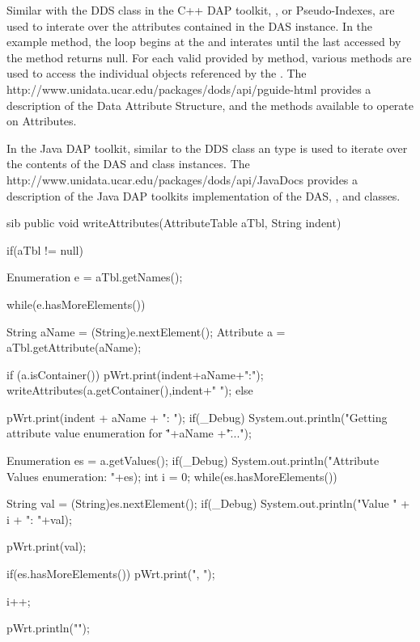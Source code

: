 \documentclass{dods-paper}
\begin{document}
Similar with the DDS class in the C++ DAP toolkit, , or
Pseudo-Indexes, are used to interate over the attributes contained in
the DAS instance.  In the example  method, the
loop begins at the  and interates until the
last  accessed by the  method
returns null.  For each valid  provided by
 method, various  methods are
used to access the individual  objects referenced by
the .  The 
{http://www.unidata.ucar.edu/packages/dods/api/pguide-html} provides a
description of the Data Attribute Structure, and the methods available
to operate on Attributes.

In the Java DAP toolkit, similar to the DDS class an 
type is used to iterate over the contents of the DAS and
 class instances.  The  {http://www.unidata.ucar.edu/packages/dods/api/JavaDocs}
provides a description of the Java DAP toolkits implementation of the
DAS, , and  classes.

\begin{vcode}{sib}
 public void writeAttributes(AttributeTable aTbl, String indent) {

    if(aTbl != null){

       Enumeration e = aTbl.getNames();

       while(e.hasMoreElements()){
          String aName = (String)e.nextElement();
          Attribute a = aTbl.getAttribute(aName);

          if (a.isContainer()) {
              pWrt.print(indent+aName+":\n");
              writeAttributes(a.getContainer(),indent+"  ");
          }
          else {
              pWrt.print(indent + aName + ": ");
              if(_Debug) { System.out.println("Getting attribute value enumeration for \""+aName +"\"...");}

              Enumeration es = a.getValues();
              if(_Debug) { System.out.println("Attribute Values enumeration: "+es);}
              int i = 0;
              while(es.hasMoreElements()){
                  String val = (String)es.nextElement();
                  if(_Debug) { System.out.println("Value " + i + ": "+val);}

                  pWrt.print(val);

                  if(es.hasMoreElements())
                     pWrt.print(", ");

                  i++;
              }
              pWrt.println("");
          }

       }
    }
 }
\end{vcode}
\end{document}
